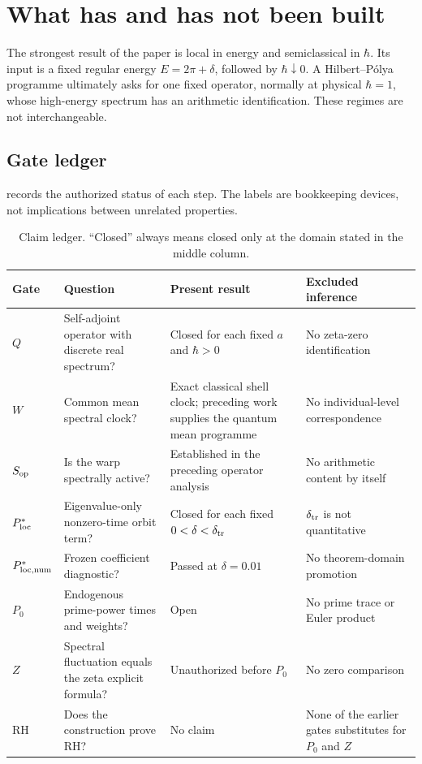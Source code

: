 \section{What has and has not been built}
\label{sec:scope}

The strongest result of the paper is local in energy and semiclassical in
\(\hbar\).  Its input is a fixed regular energy
\(E=2\pi+\delta\), followed by \(\hbar\downarrow0\).  A Hilbert--P\'olya
programme ultimately asks for one fixed operator, normally at physical
\(\hbar=1\), whose high-energy spectrum has an arithmetic identification.
These regimes are not interchangeable.

\subsection{Gate ledger}

 records the authorized status of each step.  The
labels are bookkeeping devices, not implications between unrelated
properties.

\begin{table}[t]
\centering
\caption{Claim ledger.  ``Closed'' always means closed only at the domain
stated in the middle column.}
\label{tab:gate-ledger}
\small
\begin{tabular}{@{}p{}p{}p{}p{}@{}}
\toprule
Gate & Question & Present result & Excluded inference\\
\midrule
\(Q\) & Self-adjoint operator with discrete real spectrum? &
Closed for each fixed \(a\) and \(\hbar>0\) &
No zeta-zero identification\\
\(W\) & Common mean spectral clock? &
Exact classical shell clock; preceding work supplies the quantum mean
programme &
No individual-level correspondence\\
\(S_{\rm op}\) & Is the warp spectrally active? &
Established in the preceding operator analysis &
No arithmetic content by itself\\
\(P^*_{\rm loc}\) & Eigenvalue-only nonzero-time orbit term? &
Closed for each fixed \(0<\delta<\delta_{\rm tr}\) &
\(\delta_{\rm tr}\) is not quantitative\\
\(P^*_{\rm loc,num}\) & Frozen coefficient diagnostic? &
Passed at \(\delta=0.01\) &
No theorem-domain promotion\\
\(P_0\) & Endogenous prime-power times and weights? &
Open &
No prime trace or Euler product\\
\(Z\) & Spectral fluctuation equals the zeta explicit formula? &
Unauthorized before \(P_0\) &
No zero comparison\\
RH & Does the construction prove RH? &
No claim &
None of the earlier gates substitutes for \(P_0\) and \(Z\)\\
\bottomrule
\end{tabular}
\end{table}

